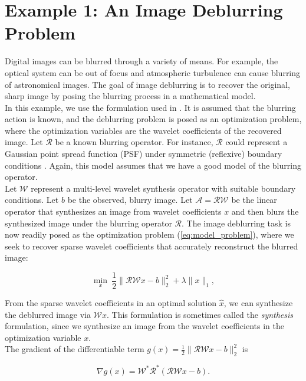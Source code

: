 \documentclass[journal]{IEEEtran}
\begin{document}
\section{Example 1: An Image Deblurring Problem}
Digital images can be blurred through a variety of means.  For example, the optical system can be out of focus and atmospheric turbulence can cause blurring of astronomical images.  The goal of image deblurring is to recover the original, sharp image by posing the blurring process in a mathematical model.\\

In this example, we use the formulation used in \cite{beck_2009}.  It is assumed that the blurring action is known, and the deblurring problem is posed as an optimization problem, where the optimization variables are the wavelet coefficients of the recovered image.  Let $\mathcal{R}$ be a known blurring operator.  For instance, $\mathcal{R}$ could represent a Gaussian point spread function (PSF) under symmetric (reflexive) boundary conditions \cite{hansen_2006}.  Again, this model assumes that we have a good model of the blurring operator.\\

Let $\mathcal{W}$ represent a multi-level wavelet synthesis operator with suitable boundary conditions.  Let $b$ be the observed, blurry image.  Let $\mathcal{A}=\mathcal{RW}$ be the linear operator that synthesizes an image from wavelet coefficients $x$ and then blurs the synthesized image under the blurring operator $\mathcal{R}$.  The image deblurring task is now readily posed as the optimization problem (\ref{eq:model_problem}), where we seek to recover sparse wavelet coefficients that accurately reconstruct the blurred image:

\begin{equation}
\label{eq:syn_problem}
\min_x~ \dfrac{1}{2}\|\mathcal{RW}x-b\|_2^2 + \lambda \|x\|_1,
\end{equation}

\noindent From the sparse wavelet coefficients in an optimal solution $\hat{x}$, we can synthesize the deblurred image via $\mathcal{W}\hat{x}$.  This formulation is sometimes called the \emph{synthesis} formulation, since we synthesize an image from the wavelet coefficients in the optimization variable $x$.\\

The gradient of the differentiable term ${g(x)=\frac{1}{2}\|\mathcal{RW}x-b\|_2^2}$ is

\[ \nabla g(x) = \mathcal{W}^\ast \mathcal{R}^\ast(\mathcal{RW}x-b). \] 
\end{document}
